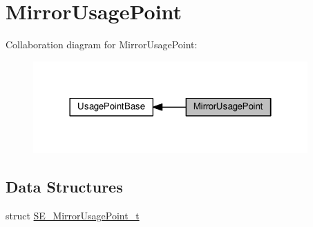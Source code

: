 \hypertarget{group__MirrorUsagePoint}{}\section{Mirror\+Usage\+Point}
\label{group__MirrorUsagePoint}
Collaboration diagram for Mirror\+Usage\+Point\+:\nopagebreak
\begin{figure}[H]
\begin{center}
\leavevmode
\includegraphics[width=298pt]{group__MirrorUsagePoint}
\end{center}
\end{figure}
\subsection*{Data Structures}
\begin{DoxyCompactItemize}
\item 
struct \hyperlink{structSE__MirrorUsagePoint__t}{S\+E\+\_\+\+Mirror\+Usage\+Point\+\_\+t}
\end{DoxyCompactItemize}
